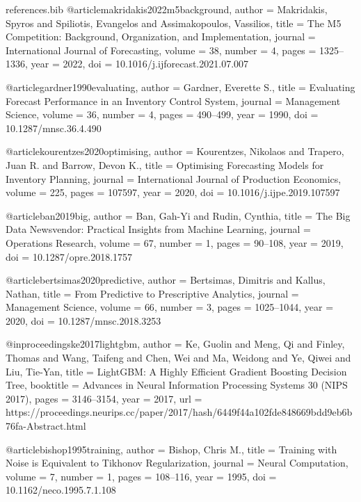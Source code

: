 \begin{filecontents*}{references.bib}
@article{makridakis2022m5background,
  author  = {Makridakis, Spyros and Spiliotis, Evangelos and Assimakopoulos, Vassilios},
  title   = {The {M5} Competition: Background, Organization, and Implementation},
  journal = {International Journal of Forecasting},
  volume  = {38},
  number  = {4},
  pages   = {1325--1336},
  year    = {2022},
  doi     = {10.1016/j.ijforecast.2021.07.007}
}

@article{gardner1990evaluating,
  author  = {Gardner, Everette S.},
  title   = {Evaluating Forecast Performance in an Inventory Control System},
  journal = {Management Science},
  volume  = {36},
  number  = {4},
  pages   = {490--499},
  year    = {1990},
  doi     = {10.1287/mnsc.36.4.490}
}

@article{kourentzes2020optimising,
  author  = {Kourentzes, Nikolaos and Trapero, Juan R. and Barrow, Devon K.},
  title   = {Optimising Forecasting Models for Inventory Planning},
  journal = {International Journal of Production Economics},
  volume  = {225},
  pages   = {107597},
  year    = {2020},
  doi     = {10.1016/j.ijpe.2019.107597}
}

@article{ban2019big,
  author  = {Ban, Gah-Yi and Rudin, Cynthia},
  title   = {The Big Data Newsvendor: Practical Insights from Machine Learning},
  journal = {Operations Research},
  volume  = {67},
  number  = {1},
  pages   = {90--108},
  year    = {2019},
  doi     = {10.1287/opre.2018.1757}
}

@article{bertsimas2020predictive,
  author  = {Bertsimas, Dimitris and Kallus, Nathan},
  title   = {From Predictive to Prescriptive Analytics},
  journal = {Management Science},
  volume  = {66},
  number  = {3},
  pages   = {1025--1044},
  year    = {2020},
  doi     = {10.1287/mnsc.2018.3253}
}

@inproceedings{ke2017lightgbm,
  author    = {Ke, Guolin and Meng, Qi and Finley, Thomas and Wang, Taifeng and Chen, Wei and Ma, Weidong and Ye, Qiwei and Liu, Tie-Yan},
  title     = {{LightGBM}: A Highly Efficient Gradient Boosting Decision Tree},
  booktitle = {Advances in Neural Information Processing Systems 30 (NIPS 2017)},
  pages     = {3146--3154},
  year      = {2017},
  url       = {https://proceedings.neurips.cc/paper/2017/hash/6449f44a102fde848669bdd9eb6b76fa-Abstract.html}
}

@article{bishop1995training,
  author  = {Bishop, Chris M.},
  title   = {Training with Noise is Equivalent to {T}ikhonov Regularization},
  journal = {Neural Computation},
  volume  = {7},
  number  = {1},
  pages   = {108--116},
  year    = {1995},
  doi     = {10.1162/neco.1995.7.1.108}
}


\end{filecontents*}
